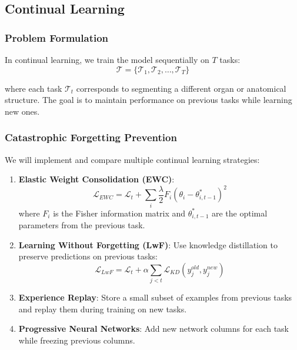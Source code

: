 \documentclass[conference]{IEEEtran}
\begin{document}
\subsection{Continual Learning}

\subsubsection{Problem Formulation}

In continual learning, we train the model sequentially on $T$ tasks:
\begin{equation}
\mathcal{T} = \{\mathcal{T}_1, \mathcal{T}_2, \ldots, \mathcal{T}_T\}
\end{equation}

where each task $\mathcal{T}_t$ corresponds to segmenting a different organ or anatomical structure. The goal is to maintain performance on previous tasks while learning new ones.

\subsubsection{Catastrophic Forgetting Prevention}

We will implement and compare multiple continual learning strategies:

\begin{enumerate}
    \item \textbf{Elastic Weight Consolidation (EWC)}:
    \begin{equation}
    \mathcal{L}_{EWC} = \mathcal{L}_t + \sum_i \frac{\lambda}{2} F_i (\theta_i - \theta_{i,t-1}^*)^2
    \end{equation}
    where $F_i$ is the Fisher information matrix and $\theta_{i,t-1}^*$ are the optimal parameters from the previous task.
    
    \item \textbf{Learning Without Forgetting (LwF)}:
    Use knowledge distillation to preserve predictions on previous tasks:
    \begin{equation}
    \mathcal{L}_{LwF} = \mathcal{L}_t + \alpha \sum_{j<t} \mathcal{L}_{KD}(y_j^{old}, y_j^{new})
    \end{equation}
    
    \item \textbf{Experience Replay}:
    Store a small subset of examples from previous tasks and replay them during training on new tasks.
    
    \item \textbf{Progressive Neural Networks}:
    Add new network columns for each task while freezing previous columns.
\end{enumerate}
\end{document}
